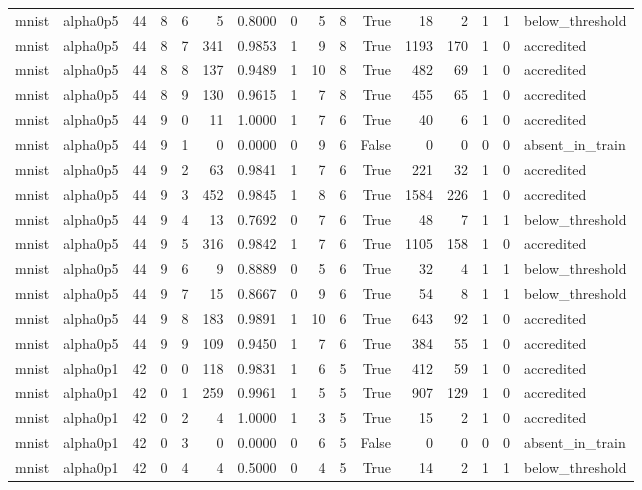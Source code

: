 \begin{tabular}{llrrrrrrrrrrrrrl}
mnist & alpha0p5 & 44 & 8 & 6 & 5 & 0.8000 & 0 & 5 & 8 & True & 18 & 2 & 1 & 1 & below\_threshold \\
mnist & alpha0p5 & 44 & 8 & 7 & 341 & 0.9853 & 1 & 9 & 8 & True & 1193 & 170 & 1 & 0 & accredited \\
mnist & alpha0p5 & 44 & 8 & 8 & 137 & 0.9489 & 1 & 10 & 8 & True & 482 & 69 & 1 & 0 & accredited \\
mnist & alpha0p5 & 44 & 8 & 9 & 130 & 0.9615 & 1 & 7 & 8 & True & 455 & 65 & 1 & 0 & accredited \\
mnist & alpha0p5 & 44 & 9 & 0 & 11 & 1.0000 & 1 & 7 & 6 & True & 40 & 6 & 1 & 0 & accredited \\
mnist & alpha0p5 & 44 & 9 & 1 & 0 & 0.0000 & 0 & 9 & 6 & False & 0 & 0 & 0 & 0 & absent\_in\_train \\
mnist & alpha0p5 & 44 & 9 & 2 & 63 & 0.9841 & 1 & 7 & 6 & True & 221 & 32 & 1 & 0 & accredited \\
mnist & alpha0p5 & 44 & 9 & 3 & 452 & 0.9845 & 1 & 8 & 6 & True & 1584 & 226 & 1 & 0 & accredited \\
mnist & alpha0p5 & 44 & 9 & 4 & 13 & 0.7692 & 0 & 7 & 6 & True & 48 & 7 & 1 & 1 & below\_threshold \\
mnist & alpha0p5 & 44 & 9 & 5 & 316 & 0.9842 & 1 & 7 & 6 & True & 1105 & 158 & 1 & 0 & accredited \\
mnist & alpha0p5 & 44 & 9 & 6 & 9 & 0.8889 & 0 & 5 & 6 & True & 32 & 4 & 1 & 1 & below\_threshold \\
mnist & alpha0p5 & 44 & 9 & 7 & 15 & 0.8667 & 0 & 9 & 6 & True & 54 & 8 & 1 & 1 & below\_threshold \\
mnist & alpha0p5 & 44 & 9 & 8 & 183 & 0.9891 & 1 & 10 & 6 & True & 643 & 92 & 1 & 0 & accredited \\
mnist & alpha0p5 & 44 & 9 & 9 & 109 & 0.9450 & 1 & 7 & 6 & True & 384 & 55 & 1 & 0 & accredited \\
mnist & alpha0p1 & 42 & 0 & 0 & 118 & 0.9831 & 1 & 6 & 5 & True & 412 & 59 & 1 & 0 & accredited \\
mnist & alpha0p1 & 42 & 0 & 1 & 259 & 0.9961 & 1 & 5 & 5 & True & 907 & 129 & 1 & 0 & accredited \\
mnist & alpha0p1 & 42 & 0 & 2 & 4 & 1.0000 & 1 & 3 & 5 & True & 15 & 2 & 1 & 0 & accredited \\
mnist & alpha0p1 & 42 & 0 & 3 & 0 & 0.0000 & 0 & 6 & 5 & False & 0 & 0 & 0 & 0 & absent\_in\_train \\
mnist & alpha0p1 & 42 & 0 & 4 & 4 & 0.5000 & 0 & 4 & 5 & True & 14 & 2 & 1 & 1 & below\_threshold \\

\end{tabular}
